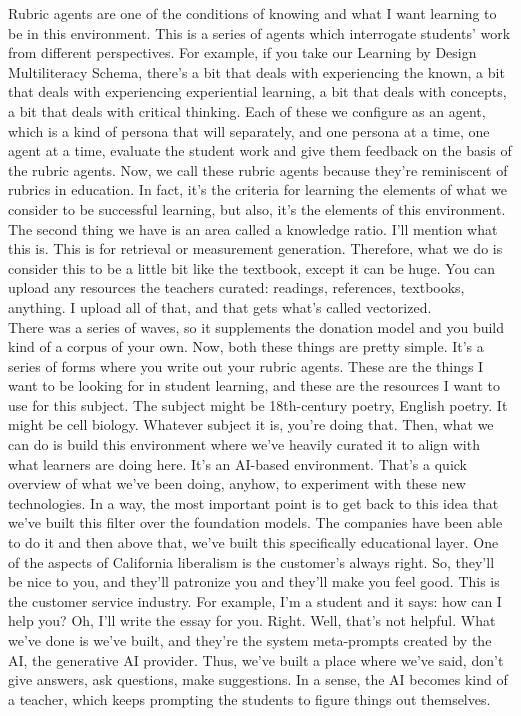 \documentclass[english]{textolivre}
\begin{document}
{    Rubric agents are one of the conditions of knowing and what I want learning to be in this environment. This is a series of agents which interrogate students’ work from different perspectives. For example, if you take our Learning by Design Multiliteracy Schema, there’s a bit that deals with experiencing the known, a bit that deals with experiencing experiential learning, a bit that deals with concepts, a bit that deals with critical thinking. Each of these we configure as an agent, which is a kind of persona that will separately, and one persona at a time, one agent at a time, evaluate the student work and give them feedback on the basis of the rubric agents. Now, we call these rubric agents because they’re reminiscent of rubrics in education. In fact, it’s the criteria for learning the elements of what we consider to be successful learning, but also, it’s the elements of this environment. The second thing we have is an area called a knowledge ratio. I’ll mention what this is. This is for retrieval or measurement generation. Therefore, what we do is consider this to be a little bit like the textbook, except it can be huge. You can upload any resources the teachers curated: readings, references, textbooks, anything. I upload all of that, and that gets what’s called vectorized.\\
    There was a series of waves, so it supplements the donation model and you build kind of a corpus of your own. Now, both these things are pretty simple. It’s a series of forms where you write out your rubric agents. These are the things I want to be looking for in student learning, and these are the resources I want to use for this subject. The subject might be 18th-century poetry, English poetry. It might be cell biology. Whatever subject it is, you’re doing that. Then, what we can do is build this environment where we’ve heavily curated it to align with what learners are doing here. It’s an AI-based environment. That’s a quick overview of what we’ve been doing, anyhow, to experiment with these new technologies. In a way, the most important point is to get back to this idea that we’ve built this filter over the foundation models. The companies have been able to do it and then above that, we’ve built this specifically educational layer. One of the aspects of California liberalism is the customer’s always right. So, they’ll be nice to you, and they’ll patronize you and they’ll make you feel good. This is the customer service industry. For example, I’m a student and it says: how can I help you? Oh, I’ll write the essay for you. Right. Well, that’s not helpful. What we’ve done is we’ve built, and they’re the system meta-prompts created by the AI, the generative AI provider. Thus, we’ve built a place where we’ve said, don’t give answers, ask questions, make suggestions. In a sense, the AI becomes kind of a teacher, which keeps prompting the students to figure things out themselves.\\
}
\end{document}
